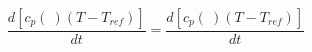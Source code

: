 \begin{equation}
\frac{d [c_p(\ ) (T- T_{ref})]}{dt} = \frac{d [c_p(\ ) (T- T_{ref})]}{dt} 
\end{equation}